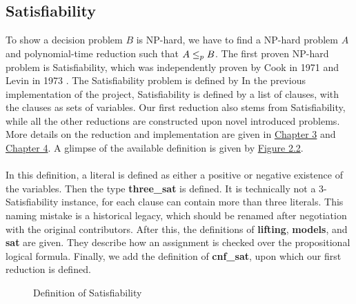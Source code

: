 \subsection*{Satisfiability}
To show a decision problem $B$ is NP-hard, 
we have to find a NP-hard problem $A$ and polynomial-time reduction 
such that $A \leq_p B$. The first proven NP-hard problem is Satisfiability, 
which was independently proven by Cook in 1971 \cite{cook2023complexity} and Levin in 1973 \cite{levin1973universal}. 
The Satisfiability problem is defined by 
In the previous implementation of the project, Satisfiability is defined by a list of clauses, with the clauses as sets of variables.
Our first reduction also stems from Satisfiability, while all the other reductions are constructed upon novel introduced problems. 
More details on the reduction and implementation are given in \hyperref[chapter:covering]{Chapter 3} and \hyperref[chapter:weighted]{Chapter 4}. 
A glimpse of the available definition is given by \hyperref[figure:2]{Figure 2.2}. \\\\
In this definition, a literal is defined as either a positive or negative existence of the variables. Then 
the type \textbf{three\_sat} is defined. It is technically not a 3-Satisfiability instance, for each clause can 
contain more than three literals. This naming mistake is a historical legacy, which should be renamed after negotiation with the original contributors.
After this, the definitions of \textbf{lifting}, \textbf{models}, and \textbf{sat} are given. They describe how an assignment is checked over the propositional 
logical formula. Finally, we add the definition of \textbf{cnf\_sat}, upon which our first reduction is defined.
\begin{figure}[!h]
    \caption{Definition of Satisfiability}
    \label{figure:2}
\end{figure}


